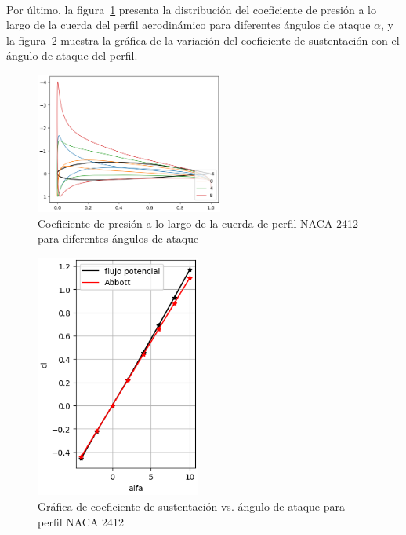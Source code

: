 \documentclass[letterpaper, openright, 12pt]{book}
\begin{document}
    \paragraph*{}
    Por último, la figura~\ref{fig:potential_flow_2412_cp_dist} presenta la
    distribución del coeficiente de presión a lo largo de la cuerda del perfil
    aerodinámico para diferentes ángulos de ataque $\alpha$, y la
    figura~\ref{fig:potential_flow_2412_cl} muestra la gráfica de la variación
    del coeficiente de sustentación con el ángulo de ataque del perfil.
    \begin{figure}[H]%
        \centering
        \includegraphics[keepaspectratio,
            width=0.55\textwidth]{./img/potential_flow_2412_cps}
        \caption[Coeficiente de presión a lo largo de la cuerda de perfil NACA
            2412]{Coeficiente de presión a lo largo de la cuerda de perfil
            NACA 2412 para diferentes ángulos de ataque}
        \label{fig:potential_flow_2412_cp_dist}
    \end{figure}

    \begin{figure}[H]%
        \centering
        \includegraphics[keepaspectratio,
            width=0.48\textwidth]{./img/potential_flow_2412_cl}
        \caption{Gráfica de coeficiente de sustentación vs. ángulo de ataque
            para perfil NACA 2412}
        \label{fig:potential_flow_2412_cl}
    \end{figure}
\end{document}
